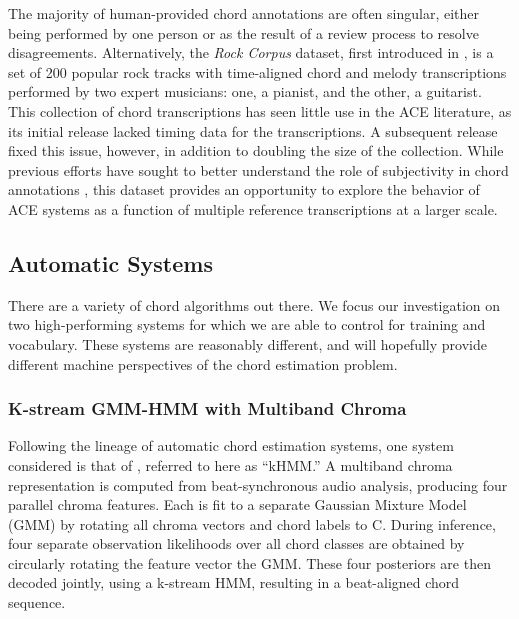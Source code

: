 \documentclass{article}
\begin{document}
The majority of human-provided chord annotations are often singular, either being performed by one person or as the result of a review process to resolve disagreements.
Alternatively, the \emph{Rock Corpus} dataset, first introduced in \cite{deClercq2011Corpus}, is a set of 200 popular rock tracks with time-aligned chord and melody transcriptions performed by two expert musicians:
one, a pianist, and the other, a guitarist.
This collection of chord transcriptions has seen little use in the ACE literature, as its initial release lacked timing data for the transcriptions.
A subsequent release fixed this issue, however, in addition to doubling the size of the collection.
While previous efforts have sought to better understand the role of subjectivity in chord annotations \cite{Ni2013Understanding}, this dataset provides an opportunity to explore the behavior of ACE systems as a function of multiple reference transcriptions at a larger scale.


\subsection{Automatic Systems}
\label{subsec:systems}

There are a variety of chord algorithms out there.
We focus our investigation on two high-performing systems for which we are able to control for training and vocabulary.
These systems are reasonably different, and will hopefully provide different machine perspectives of the chord estimation problem.


\subsubsection{K-stream GMM-HMM with Multiband Chroma}

Following the lineage of automatic chord estimation systems, one system considered is that of \cite{Cho2014Improved}, referred to here as ``kHMM.''
A multiband chroma representation is computed from beat-synchronous audio analysis, producing four parallel chroma features.
Each is fit to a separate Gaussian Mixture Model (GMM) by rotating all chroma vectors and chord labels to C.
During inference, four separate observation likelihoods over all chord classes are obtained by circularly rotating the feature vector the GMM.
These four posteriors are then decoded jointly, using a k-stream HMM, resulting in a beat-aligned chord sequence.
\end{document}
